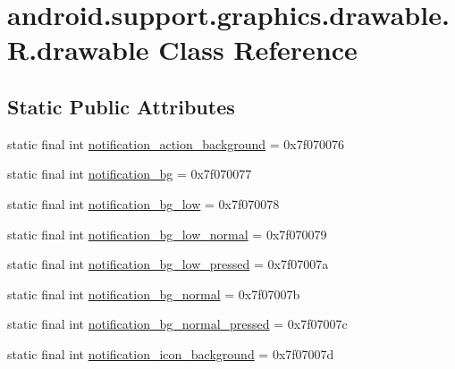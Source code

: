 \hypertarget{classandroid_1_1support_1_1graphics_1_1drawable_1_1_r_1_1drawable}{}\section{android.\+support.\+graphics.\+drawable.\+R.\+drawable Class Reference}
\label{classandroid_1_1support_1_1graphics_1_1drawable_1_1_r_1_1drawable}
\subsection*{Static Public Attributes}
\begin{DoxyCompactItemize}
\item 
static final int \mbox{\hyperlink{classandroid_1_1support_1_1graphics_1_1drawable_1_1_r_1_1drawable_a406ec3cf68ebdc6af7c204f382d49b19}{notification\+\_\+action\+\_\+background}} = 0x7f070076
\item 
static final int \mbox{\hyperlink{classandroid_1_1support_1_1graphics_1_1drawable_1_1_r_1_1drawable_af5fd5e375a2f7e28740270ae167381fd}{notification\+\_\+bg}} = 0x7f070077
\item 
static final int \mbox{\hyperlink{classandroid_1_1support_1_1graphics_1_1drawable_1_1_r_1_1drawable_a3e29d11ded19247c205235d18d5a5435}{notification\+\_\+bg\+\_\+low}} = 0x7f070078
\item 
static final int \mbox{\hyperlink{classandroid_1_1support_1_1graphics_1_1drawable_1_1_r_1_1drawable_a13c8698f9438958ffcb58dd92355d0fb}{notification\+\_\+bg\+\_\+low\+\_\+normal}} = 0x7f070079
\item 
static final int \mbox{\hyperlink{classandroid_1_1support_1_1graphics_1_1drawable_1_1_r_1_1drawable_a78dde7772b5ff823a2443632948f07bb}{notification\+\_\+bg\+\_\+low\+\_\+pressed}} = 0x7f07007a
\item 
static final int \mbox{\hyperlink{classandroid_1_1support_1_1graphics_1_1drawable_1_1_r_1_1drawable_a48297e7e7d80122ef6353048d4a59eb8}{notification\+\_\+bg\+\_\+normal}} = 0x7f07007b
\item 
static final int \mbox{\hyperlink{classandroid_1_1support_1_1graphics_1_1drawable_1_1_r_1_1drawable_ae12eab972ee6c7697d3c8248b9507af6}{notification\+\_\+bg\+\_\+normal\+\_\+pressed}} = 0x7f07007c
\item 
static final int \mbox{\hyperlink{classandroid_1_1support_1_1graphics_1_1drawable_1_1_r_1_1drawable_aa9a6bfdcafe1f6d70796fcfe6e622eeb}{notification\+\_\+icon\+\_\+background}} = 0x7f07007d

\end{DoxyCompactItemize}
